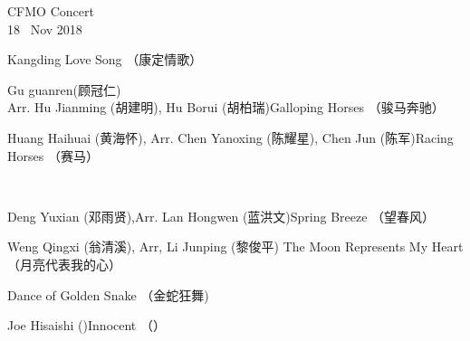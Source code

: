 \documentclass[letter,6pt,poets]{ConcProg}
\begin{document}
\begin{programme}{
    CFMO Concert
\\  {\normalsize 18 ~Nov 2018}
}
\begin{part}[]
\begin{composition}{}{}{Kangding Love Song  （康定情歌）}{}
    \end{composition}
    \begin{composition}{Gu guanren(顾冠仁)\\ Arr. Hu Jianming (胡建明), Hu Borui (胡柏瑞)}{}{Galloping Horses  （骏马奔驰）}{}
    \end{composition}
    \begin{composition}{Huang Haihuai (黄海怀), Arr. Chen Yanoxing (陈耀星), Chen Jun (陈军)}{}{Racing Horses  （赛马）}{}
    \end{composition}\\
    \begin{composition}{Deng Yuxian (邓雨贤),Arr. Lan Hongwen (蓝洪文)}{}{Spring Breeze  （望春风）}{}
    \end{composition}
    \begin{composition}{Weng Qingxi (翁清溪), Arr, Li Junping (黎俊平) }{}{The Moon Represents My Heart  （月亮代表我的心）}{}
    \end{composition}
    \begin{composition}{}{}{Dance of Golden Snake  （金蛇狂舞)}{}
    \end{composition}
    \begin{composition}{Joe Hisaishi ()}{}{Innocent （） }{}
                   {}{}
    \end{composition}
    
    



\end{part}
\end{programme}
\end{document}
